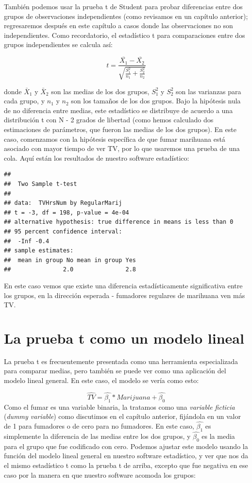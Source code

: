 \documentclass[
  12pt,
]{book}
\begin{document}
También podemos usar la prueba t de Student para probar diferencias entre dos grupos de observaciones independientes (como revisamos en un capítulo anterior); regresaremos después en este capítulo a casos donde las observaciones no son independientes. Como recordatorio, el estadístico t para comparaciones entre dos grupos independientes se calcula así:

\[
t = \frac{\bar{X_1} - \bar{X_2}}{\sqrt{\frac{S_1^2}{n_1} + \frac{S_2^2}{n_2}}}
\]

donde \(\bar{X}_1\) y \(\bar{X}_2\) son las medias de los dos grupos, \(S^2_1\) y \(S^2_2\) son las varianzas para cada grupo, y \(n_1\) y \(n_2\) son los tamaños de los dos grupos. Bajo la hipótesis nula de no diferencia entre medias, este estadístico se distribuye de acuerdo a una distribución t con N - 2 grados de libertad (como hemos calculado dos estimaciones de parámetros, que fueron las medias de los dos grupos). En este caso, comenzamos con la hipótesis específica de que fumar marihuana está asociado con mayor tiempo de ver TV, por lo que usaremos una prueba de una cola. Aquí están los resultados de nuestro software estadístico:

\begin{verbatim}
## 
## 	Two Sample t-test
## 
## data:  TVHrsNum by RegularMarij
## t = -3, df = 198, p-value = 4e-04
## alternative hypothesis: true difference in means is less than 0
## 95 percent confidence interval:
##  -Inf -0.4
## sample estimates:
##  mean in group No mean in group Yes 
##               2.0               2.8
\end{verbatim}

En este caso vemos que existe una diferencia estadísticamente significativa entre los grupos, en la dirección esperada - fumadores regulares de marihuana ven más TV.

\hypertarget{ttest-linear-model}{%
\section{La prueba t como un modelo lineal}\label{ttest-linear-model}}

La prueba t es frecuentemente presentada como una herramienta especializada para comparar medias, pero también se puede ver como una aplicación del modelo lineal general. En este caso, el modelo se vería como esto:

\[
\hat{TV} = \hat{\beta_1}*Marijuana + \hat{\beta_0}
\]
Como el fumar es una variable binaria, la tratamos como una \emph{variable ficticia} (\emph{dummy variable}) como discutimos en el capítulo anterior, fijándola en un valor de 1 para fumadores o de cero para no fumadores. En este caso, \(\hat{\beta_1}\) es simplemente la diferencia de las medias entre los dos grupos, y \(\hat{\beta_0}\) es la media para el grupo que fue codificado con cero. Podemos ajustar este modelo usando la función del modelo lineal general en nuestro software estadístico, y ver que nos da el mismo estadístico t como la prueba t de arriba, excepto que fue negativa en ese caso por la manera en que nuestro software acomoda los grupos:
\end{document}

